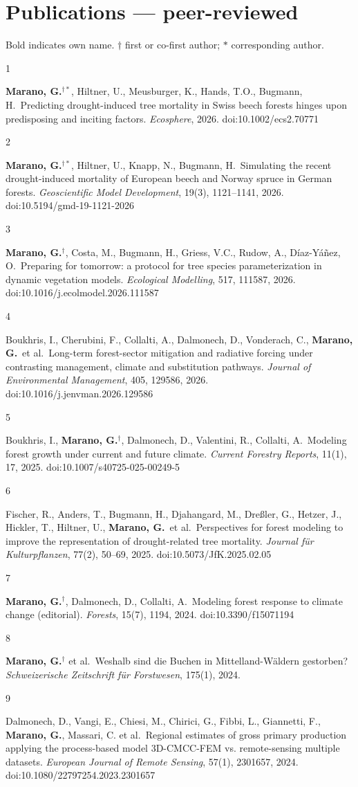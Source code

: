\documentclass[10pt,a4paper]{article}
\newcommand{\pubitem}[3]{%
  \noindent\begin{minipage}[t]{0.6cm}\raggedright\footnotesize\color{muted}#1\end{minipage}%
  \begin{minipage}[t]{\dimexpr\linewidth-0.6cm\relax}\raggedright\small #2\ {\color{inksoft}#3}\end{minipage}\par\vspace{4pt}}
\newcommand{\me}{\textbf{Marano, G.}}
\begin{document}
\section*{Publications --- peer-reviewed}
{\footnotesize\color{muted}Bold indicates own name. $\dagger$ first or co-first author; $\ast$ corresponding author.}\\[5pt]
\pubitem{1}{\me$^{\dagger\ast}$, Hiltner, U., Meusburger, K., Hands, T.O., Bugmann, H.}{Predicting drought-induced tree mortality in Swiss beech forests hinges upon predisposing and inciting factors. \emph{Ecosphere}, 2026. doi:10.1002/ecs2.70771}
\pubitem{2}{\me$^{\dagger\ast}$, Hiltner, U., Knapp, N., Bugmann, H.}{Simulating the recent drought-induced mortality of European beech and Norway spruce in German forests. \emph{Geoscientific Model Development}, 19(3), 1121--1141, 2026. doi:10.5194/gmd-19-1121-2026}
\pubitem{3}{\me$^{\dagger}$, Costa, M., Bugmann, H., Griess, V.C., Rudow, A., D\'iaz-Y\'a\~nez, O.}{Preparing for tomorrow: a protocol for tree species parameterization in dynamic vegetation models. \emph{Ecological Modelling}, 517, 111587, 2026. doi:10.1016/j.ecolmodel.2026.111587}
\pubitem{4}{Boukhris, I., Cherubini, F., Collalti, A., Dalmonech, D., Vonderach, C., \me\ et al.}{Long-term forest-sector mitigation and radiative forcing under contrasting management, climate and substitution pathways. \emph{Journal of Environmental Management}, 405, 129586, 2026. doi:10.1016/j.jenvman.2026.129586}
\pubitem{5}{Boukhris, I., \me$^{\dagger}$, Dalmonech, D., Valentini, R., Collalti, A.}{Modeling forest growth under current and future climate. \emph{Current Forestry Reports}, 11(1), 17, 2025. doi:10.1007/s40725-025-00249-5}
\pubitem{6}{Fischer, R., Anders, T., Bugmann, H., Djahangard, M., Dre\ss ler, G., Hetzer, J., Hickler, T., Hiltner, U., \me\ et al.}{Perspectives for forest modeling to improve the representation of drought-related tree mortality. \emph{Journal f\"ur Kulturpflanzen}, 77(2), 50--69, 2025. doi:10.5073/JfK.2025.02.05}
\pubitem{7}{\me$^{\dagger}$, Dalmonech, D., Collalti, A.}{Modeling forest response to climate change (editorial). \emph{Forests}, 15(7), 1194, 2024. doi:10.3390/f15071194}
\pubitem{8}{\me$^{\dagger}$ et al.}{Weshalb sind die Buchen in Mittelland-W\"aldern gestorben? \emph{Schweizerische Zeitschrift f\"ur Forstwesen}, 175(1), 2024.}
\pubitem{9}{Dalmonech, D., Vangi, E., Chiesi, M., Chirici, G., Fibbi, L., Giannetti, F., \me, Massari, C. et al.}{Regional estimates of gross primary production applying the process-based model 3D-CMCC-FEM vs. remote-sensing multiple datasets. \emph{European Journal of Remote Sensing}, 57(1), 2301657, 2024. doi:10.1080/22797254.2023.2301657}
\end{document}
